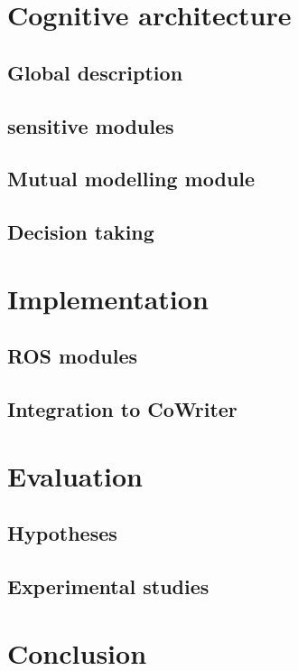 \documentclass[10pt,a4paper,twocolumn]{article}
\begin{document}
\section{Cognitive architecture}

\subsection{Global description}

\subsection{sensitive modules}

\subsection{Mutual modelling module}

\subsection{Decision taking}

\section{Implementation}

\subsection{ROS modules}

\subsection{Integration to CoWriter}

\section{Evaluation}

\subsection{Hypotheses}

\subsection{Experimental studies}

\section{Conclusion}





 
\end{document}
